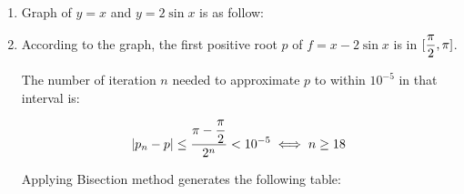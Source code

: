 \documentclass[../../Assignments.tex]{subfiles}
\begin{document}
\begin{solution}
    \begin{enumerate}[label = (\alph*)]
        \item Graph of \(y = x\) and \(y = 2 \sin{x}\) is as follow:

            \begin{center}
                
            \end{center}

        \item According to the graph, the first positive root \(p\) of \(f = x -
            2 \sin{x}\) is in \(\interval{\dfrac{\pi}{2}}{\pi}\).

            The number of iteration \(n\) needed to approximate \(p\) to within
            \(10^{-5}\) in that interval is:

            \[\abs{p_n - p} \leq \frac{\pi - \dfrac{\pi}{2}}{2^n} < 10^{-5} \iff n \geq 18\]

            Applying Bisection method generates the following table:


\end{enumerate}
\end{solution}
\end{document}
